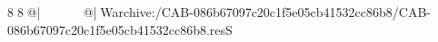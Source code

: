 8  8  @|                                                  @| W   archive:/CAB-086b67097c20c1f5e05cb41532cc86b8/CAB-086b67097c20c1f5e05cb41532cc86b8.resS 